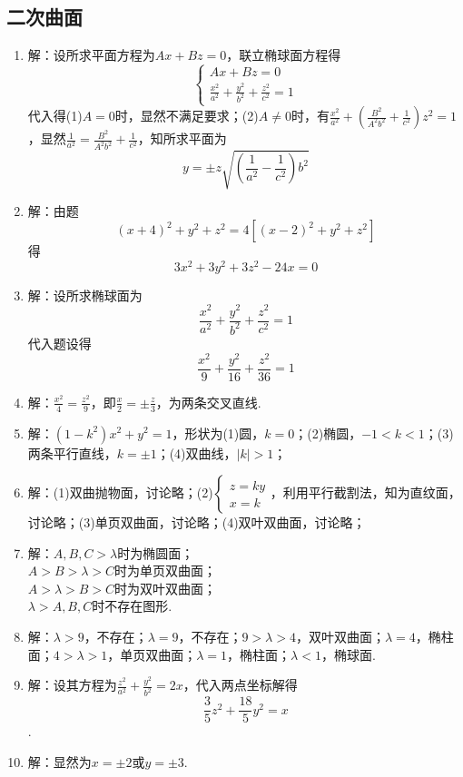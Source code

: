 \documentclass[UTF8]{ctexart}
\begin{document}
\subsection{二次曲面}
\begin{enumerate}
\item 解：设所求平面方程为$Ax+Bz=0$，联立椭球面方程得$$\left\{\begin{array}{l}Ax+Bz=0\\\displaystyle\frac{x^2}{a^2}+\displaystyle\frac{y^2}{b^2}+\displaystyle\frac{z^2}{c^2}=1\end{array}\right.$$代入得(1)$A=0$时，显然不满足要求；(2)$A\neq0$时，有$\displaystyle\frac{x^2}{a^2}+\left(\displaystyle\frac{B^2}{A^2b^2}+\displaystyle\frac{1}{c^2}\right)z^2=1$，显然$\displaystyle\frac{1}{a^2}=\displaystyle\frac{B^2}{A^2b^2}+\displaystyle\frac{1}{c^2}$，知所求平面为$$y=\pm z\sqrt{\left(\frac{1}{a^2}-\frac{1}{c^2}\right)b^2}$$
\item 解：由题$$\left(x+4\right)^2+y^2+z^2=4\left[\left(x-2\right)^2+y^2+z^2\right]$$得$$3x^2+3y^2+3z^2-24x=0$$

\item 解：设所求椭球面为$$\displaystyle\frac{x^2}{a^2}+\displaystyle\frac{y^2}{b^2}+\displaystyle\frac{z^2}{c^2}=1$$代入题设得$$\displaystyle\frac{x^2}{9}+\displaystyle\frac{y^2}{16}+\displaystyle\frac{z^2}{36}=1$$

\item 解：$\displaystyle\frac{x^2}{4}=\displaystyle\frac{z^2}{9}$，即$\displaystyle\frac{x}{2}=\pm\displaystyle\frac{z}{3}$，为两条交叉直线.

\item 解：$\left(1-k^2\right)x^2+y^2=1$，形状为(1)圆，$k=0$；(2)椭圆，$-1<k<1$；(3)两条平行直线，$k=\pm1$；(4)双曲线，$\left|k\right|>1$；

\item 解：(1)双曲抛物面，讨论略；(2)$\left\{\begin{array}{l}z=ky\\x=k\end{array}\right.$，利用平行截割法，知为直纹面，讨论略；(3)单页双曲面，讨论略；(4)双叶双曲面，讨论略；

\item 解：$A,B,C>\lambda$时为椭圆面；\\
$A>B>\lambda>C$时为单页双曲面；\\
$A>\lambda>B>C$时为双叶双曲面；\\
$\lambda>A,B,C$时不存在图形. 

\item 解：$\lambda>9$，不存在；$\lambda=9$，不存在；$9>\lambda>4$，双叶双曲面；$\lambda=4$，椭柱面；$4>\lambda>1$，单页双曲面；$\lambda=1$，椭柱面；$\lambda<1$，椭球面.

\item 解：设其方程为$\displaystyle\frac{z^2}{a^2}+\displaystyle\frac{y^2}{b^2}=2x$，代入两点坐标解得$$\frac{3}{5}z^2+\frac{18}{5}y^2=x$$.

\item 解：显然为$x=\pm2$或$y=\pm3$.
\end{enumerate}
\end{document}

